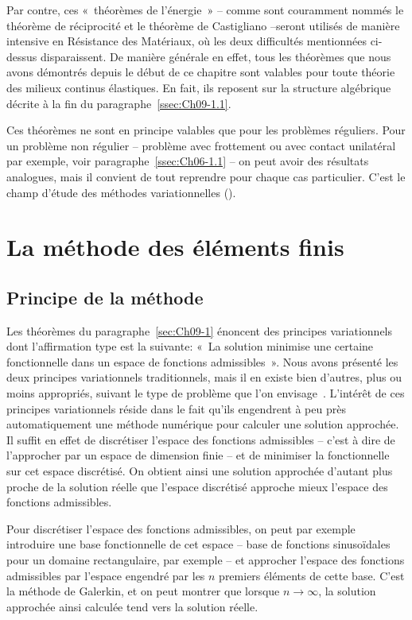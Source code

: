 Par contre, ces «~théorèmes de l'énergie~» -- comme sont couramment nommés le théorème de réciprocité et le théorème de Castigliano --seront utilisés de manière intensive en Résistance des Matériaux, où les deux difficultés mentionnées ci-dessus disparaissent.
De manière générale en effet, tous les théorèmes que nous avons démontrés depuis le début de ce chapitre sont valables pour toute théorie des milieux continus élastiques.
En fait, ils reposent sur la structure algébrique décrite à la fin du paragraphe~\ref{ssec:Ch09-1.1}.

Ces théorèmes ne sont en principe valables que pour les problèmes réguliers.
Pour un problème non régulier -- problème avec frottement ou avec contact unilatéral par exemple, voir paragraphe~\ref{ssec:Ch06-1.1} -- on peut avoir des résultats analogues, mais il convient de tout reprendre pour chaque cas particulier.
C'est le champ d'étude des méthodes variationnelles (\cite{Duvaut-72}). 

\section{La méthode des éléments finis} \label{sec:Ch09-3}
\subsection{Principe de la méthode} \label{ssec:Ch09-3.1}
Les théorèmes du paragraphe~\ref{sec:Ch09-1} énoncent des principes variationnels dont l'affirmation type est la suivante: «~La solution minimise une certaine fonctionnelle dans un espace de fonctions admissibles~».
Nous avons présenté les deux principes variationnels traditionnels, mais il en existe bien d'autres, plus ou moins appropriés, suivant le type de problème que l'on envisage~\cite{Valid-77}.
L'intérêt de ces principes variationnels réside dans le fait qu'ils engendrent à peu près automatiquement une méthode numérique pour calculer une solution approchée.
Il suffit en effet de discrétiser l'espace des fonctions admissibles -- c'est à dire de l'approcher par un espace de dimension finie -- et de minimiser la fonctionnelle sur cet espace discrétisé.
On obtient ainsi une solution approchée d'autant plus proche de la solution réelle que l'espace discrétisé approche mieux l'espace des fonctions admissibles. 

Pour discrétiser l'espace des fonctions admissibles, on peut par exemple introduire une base fonctionnelle de cet espace -- base de fonctions sinusoïdales pour un domaine rectangulaire, par exemple -- et approcher l'espace des fonctions admissibles par l'espace engendré par les $n$ premiers éléments de cette base. 
C'est la méthode de Galerkin, et on peut montrer que lorsque $n\rightarrow\infty$, la solution approchée ainsi calculée tend vers la solution réelle. 

